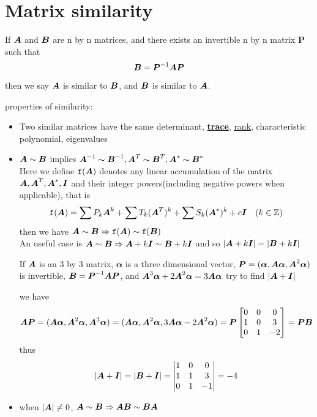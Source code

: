 \documentclass{overview}
\begin{document}
\section{Matrix similarity}


If $\boldsymbol{A}$ and $\boldsymbol{B}$ are n by n matrices, and there exists an invertible
n by n matrix $\boldsymbol{P}$ such that
\[
	\boldsymbol{B} = \boldsymbol{P}^{-1}\boldsymbol{A} \boldsymbol{P}
\]
then we say $\boldsymbol{A}$ is similar to $\boldsymbol{B}$, and $\boldsymbol{B}$ is similar to $\boldsymbol{A}$.

properties of similarity:
\begin{itemize}
	\item Two similar matrices have the same determinant, \underline{\textbf{trace}},
		\underline{rank}, characteristic polynomial, eigenvalues
	\item $\boldsymbol{A}\sim\boldsymbol{B}$ implies $\boldsymbol{A} ^{-1} \sim \boldsymbol{B}^{-1}, \boldsymbol{A}^{T} \sim \boldsymbol{B}^{T}, \boldsymbol{A}^{*} \sim \boldsymbol{B}^{*}$\\
		Here we define $\texttt{f} (\boldsymbol{A})$ denotes any linear accumulation of the
		matrix $\boldsymbol{A},\boldsymbol{A}^{T},\boldsymbol{A}^{*},\boldsymbol{I}$ and their integer powers(including negative powers
		when applicable), that is
		\[
			\texttt{f} (\boldsymbol{A}) = \sum P_k \boldsymbol{A}^{k} + \sum T_k (\boldsymbol{A}^{T})^k + \sum S_k (\boldsymbol{A}^{*})^k 
			+ c\boldsymbol{I}
			\quad (k \in \mathbb{Z})
		\] 
		then we have $\boldsymbol{A} \sim \boldsymbol{B} \Rightarrow \texttt{f} (\boldsymbol{A}) \sim \texttt{f} (\boldsymbol{B})$ \\
		An useful case is $\boldsymbol{A} \sim \boldsymbol{B} \Rightarrow \boldsymbol{A} + k\boldsymbol{I} \sim \boldsymbol{B} + k\boldsymbol{I}$ and so
		$|\boldsymbol{A}+k\boldsymbol{I}| = |\boldsymbol{B} + k\boldsymbol{I}|$ \\
		\begin{example}
		If $\boldsymbol{A}$ is an 3 by 3 matrix, $\boldsymbol{\alpha}$ is a three dimensional vector,
		$\boldsymbol{P}=(\boldsymbol{\alpha}, \boldsymbol{A}\boldsymbol{\alpha}, \boldsymbol{A}^{2}\boldsymbol{\alpha})$ is invertible,
		$\boldsymbol{B} = \boldsymbol{P}^{-1}\boldsymbol{A} \boldsymbol{P}$, and $\boldsymbol{A}^{3}\boldsymbol{\alpha} + 2\boldsymbol{A}^{2} \boldsymbol{\alpha}
		= 3\boldsymbol{A} \boldsymbol{\alpha} $ try to find $|\boldsymbol{A}+\boldsymbol{I}|$
		\begin{answer}
		we have
		\[
		\boldsymbol{A}\boldsymbol{P}=
		(\boldsymbol{A}\boldsymbol{\alpha}, \boldsymbol{A}^{2}\boldsymbol{\alpha}, \boldsymbol{A}^{3}\boldsymbol{\alpha}) =
		(\boldsymbol{A}\boldsymbol{\alpha}, \boldsymbol{A}^2\boldsymbol{\alpha}, 3\boldsymbol{A} \boldsymbol{\alpha} - 2\boldsymbol{A}^{2} \boldsymbol{\alpha}) = 
		\boldsymbol{P}
		\begin{bmatrix}
			0 & 0 & 0 \\
			1 & 0 & 3 \\
			0 & 1 & -2 \\
		\end{bmatrix}
		= \boldsymbol{P}\boldsymbol{B}
		\] 
		thus 
		\[
			|\boldsymbol{A} + \boldsymbol{I}| = |\boldsymbol{B} + \boldsymbol{I}| = 
		 \begin{vmatrix}
			 1 & 0 & 0 \\
			 1 & 1 & 3 \\
			 0 & 1 & -1 \\
		\end{vmatrix}=-4
	\]
		\end{answer}
		\end{example}

	\item when $|\boldsymbol{A}|\ne 0$, $\boldsymbol{A}\sim\boldsymbol{B} \Rightarrow \boldsymbol{A}\boldsymbol{B} \sim \boldsymbol{B}\boldsymbol{A}$
\end{itemize}
\end{document}
